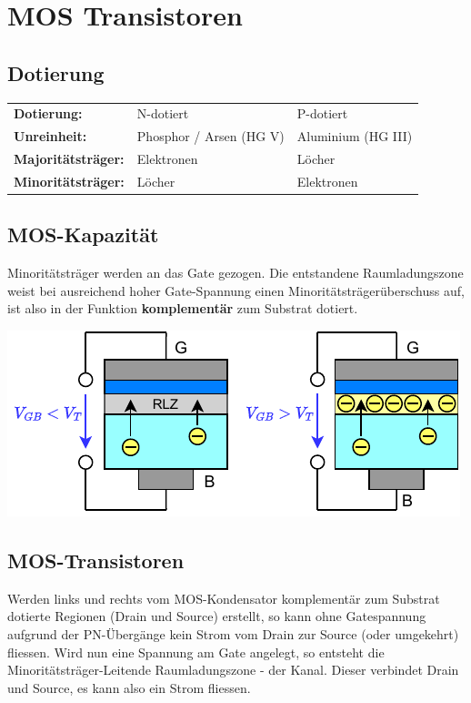 \section{MOS Transistoren}

\subsection{Dotierung}
\begin{center}
    \begin{tabular}{lll}
        \textbf{Dotierung:}          & N-dotiert                & P-dotiert             \\
        \textbf{Unreinheit:}         & Phosphor / Arsen (HG V)  & Aluminium (HG III)    \\
        \textbf{Majoritätsträger:}   & Elektronen               & Löcher                \\
        \textbf{Minoritätsträger:}   & Löcher                   & Elektronen            \\
    \end{tabular}
\end{center}


\subsection{MOS-Kapazität}
\begin{minipage}[t]{0.5\columnwidth}
    Minoritätsträger werden an das Gate gezogen.
    Die entstandene Raumladungszone weist bei ausreichend hoher Gate-Spannung einen Minoritätsträgerüberschuss auf, ist also in der Funktion \textbf{komplementär} zum Substrat dotiert.
\end{minipage}
\hfill
\begin{minipage}[t]{0.48\columnwidth}
    \includegraphics[width=\columnwidth, align=t]{images/02_MOS_kapazitaet.pdf}
\end{minipage}


\subsection{MOS-Transistoren}
Werden links und rechts vom MOS-Kondensator komplementär zum Substrat dotierte Regionen (Drain und Source) erstellt, so kann ohne Gatespannung aufgrund der PN-Übergänge kein Strom vom Drain zur Source (oder umgekehrt) fliessen.
Wird nun eine Spannung am Gate angelegt, so entsteht die Minoritätsträger-Leitende Raumladungszone - der Kanal.
Dieser verbindet Drain und Source, es kann also ein Strom fliessen.

